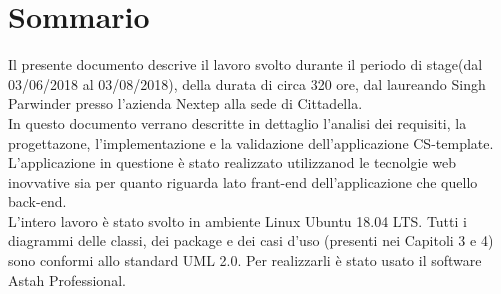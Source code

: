 
\cleardoublepage
{}
{}
\begingroup
\let\clearpage\relax
\let\cleardoublepage\relax
\let\cleardoublepage\relax

\chapter*{Sommario}
Il presente documento descrive il lavoro svolto durante il periodo di stage(dal 03/06/2018 al 03/08/2018), della durata di circa 320 ore, dal laureando Singh Parwinder presso l'azienda Nextep alla sede di Cittadella.
\\
In questo documento verrano descritte in dettaglio l'analisi dei requisiti, la progettazone, l'implementazione e la validazione dell'applicazione CS-template. L'applicazione in questione è stato realizzato utilizzanod le tecnolgie web inovvative sia per quanto riguarda lato frant-end dell'applicazione che quello back-end.\\
L'intero lavoro è stato svolto in ambiente Linux Ubuntu 18.04 LTS. Tutti i diagrammi delle classi, dei package e dei casi d’uso (presenti nei Capitoli 3 e
4) sono conformi allo standard UML 2.0. Per realizzarli è stato usato il software Astah
Professional.  

%
%


